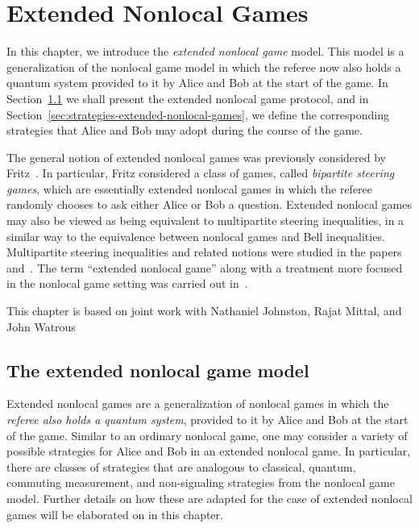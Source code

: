 \chapter{Extended Nonlocal Games}
\label{chap:extended_nonlocal_games}

In this chapter, we introduce the \emph{extended nonlocal game} model. This model is a generalization of the nonlocal game model in which the referee now also holds a quantum system provided to it by Alice and Bob at the start of the game. In Section~\ref{sec:the-model-of-extended-nonlocal-games} we shall present the extended nonlocal game protocol, and in Section~\ref{sec:strategies-extended-nonlocal-games}, we define the corresponding strategies that Alice and Bob may adopt during the course of the game. 

The general notion of extended nonlocal games was previously considered by Fritz~\cite{Fritz2012}. In particular, Fritz considered a class of games, called \emph{bipartite steering games}, which are essentially extended nonlocal games in which the referee randomly chooses to ask either Alice or Bob a question. Extended nonlocal games may also be viewed as being equivalent to multipartite steering inequalities, in a similar way to the equivalence between nonlocal games and Bell inequalities. Multipartite steering inequalities and related notions were studied in the papers~\cite{Cavalcanti2015} and~\cite{Sainz2015}. The term ``extended nonlocal game'' along with a treatment more focused in the nonlocal game setting was carried out in~\cite{Johnston2015a}. 

This chapter is based on joint work with Nathaniel Johnston, Rajat Mittal, and John Watrous~\cite{Johnston2015a}

\minitoc

\section{The extended nonlocal game model}
\label{sec:the-model-of-extended-nonlocal-games}

Extended nonlocal games are a generalization of nonlocal games in which the \emph{referee also holds a quantum system}, provided to it by Alice and Bob at the start of the game. Similar to an ordinary nonlocal game, one may consider a variety of possible strategies for Alice and Bob in an extended nonlocal game. In particular, there are classes of strategies that are analogous to classical, quantum, commuting measurement, and non-signaling strategies from the nonlocal game model. Further details on how these are adapted for the case of extended nonlocal games will be elaborated on in this chapter. 

